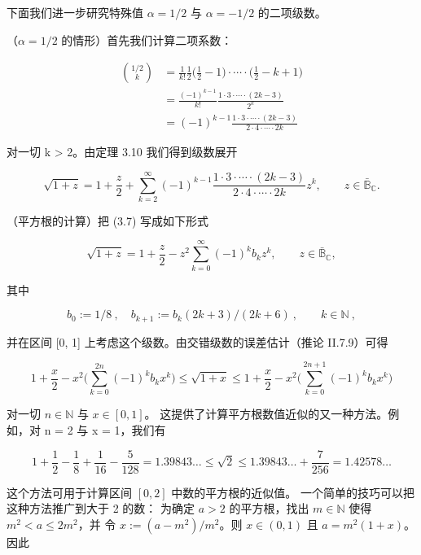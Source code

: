 \begin{example}

下面我们进一步研究特殊值 $ \alpha = 1/2 $ 与 $ \alpha = -1/2 $ 的二项级数。

\begin{items}
\item

（$ \alpha = 1/2 $ 的情形）首先我们计算二项系数：

\begin{equation*}
\begin{aligned}
\binom{1/2}{k}&=\frac{1}{k!}\frac{1}{2}\Big(\frac{1}{2}-1\Big)\cdot\cdots\cdot\Big(\frac{1}{2}-k+1\Big)\\&=\frac{(-1)^{k-1}}{k!}\frac{1\cdot3\cdot\cdots\cdot(2k-3)}{2^{k}}\\&=(-1)^{k-1}\frac{1\cdot3\cdot\cdots\cdot(2k-3)}{2\cdot4\cdot\cdots\cdot2k}
\end{aligned}
\end{equation*}

对一切 k > 2。由定理 3.10 我们得到级数展开

\begin{equation}
\sqrt{1+z}=1+\frac{z}{2}+\sum_{k=2}^{\infty}(-1)^{k-1}\frac{1\cdot3\cdot\cdots\cdot(2k-3)}{2\cdot4\cdot\cdots\cdot2k}z^{k},\qquad z\in\bar{\mathbb{B}}_{\mathbb{C}}.
\end{equation}
\item

（平方根的计算）把 (3.7) 写成如下形式

\[
\sqrt{1+z}=1+\frac{z}{2}-z^{2}\sum_{k=0}^{\infty}(-1)^{k}b_{k}z^{k},\qquad z\in\bar{\mathbb{B}}_{\mathbb{C}},
\]

其中

\[
b_{0}:=1/8~,\quad b_{k+1}:=b_{k}(2k+3)/(2k+6)~,\qquad k\in\mathbb{N}~,
\]

并在区间 [0, 1] 上考虑这个级数。由交错级数的误差估计（推论 II.7.9）可得

\[
1+\frac{x}{2}-x^{2}\Big(\sum_{k=0}^{2n}(-1)^{k}b_{k}x^{k}\Big)\leq\sqrt{1+x}\leq1+\frac{x}{2}-x^{2}\Big(\sum_{k=0}^{2n+1}(-1)^{k}b_{k}x^{k}\Big)
\]

对一切 $ n \in \mathbb{N} $ 与 $ x \in [0,1] $。
这提供了计算平方根数值近似的又一种方法。例如，对 n = 2 与 x = 1，我们有

\[
1+\frac{1}{2}-\frac{1}{8}+\frac{1}{16}-\frac{5}{128}=1.39843\ldots\leq\sqrt{2}\leq1.39843\ldots+\frac{7}{256}=1.42578\ldots
\]

这个方法可用于计算区间 $ [0,2] $ 中数的平方根的近似值。
一个简单的技巧可以把这种方法推广到大于 2 的数：
为确定 $ a > 2 $ 的平方根，找出 $ m \in \mathbb{N} $ 使得 $ m^2 < a \leq 2m^2 $，并
令 $ x := (a - m^2)/m^2 $。则 $ x \in (0,1) $ 且 $ a = m^2(1 + x) $。因此


\end{items}
\end{example}

